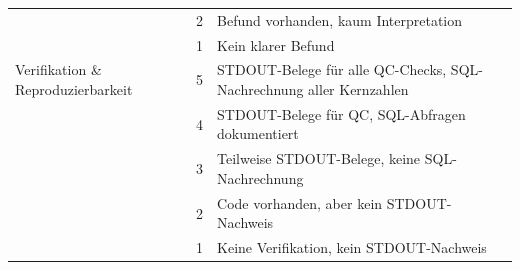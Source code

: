 \documentclass[11pt,a4paper]{article}
\begin{document}
\begin{table}[h]
\begin{tabular}{p{2.8cm}p{1.3cm}p{9cm}}
  & 2 & Befund vorhanden, kaum Interpretation \\
  & 1 & Kein klarer Befund \\
\midrule
Verifikation \& Reproduzierbarkeit
  & 5 & STDOUT-Belege für alle QC-Checks, SQL-Nachrechnung aller Kernzahlen \\
  & 4 & STDOUT-Belege für QC, SQL-Abfragen dokumentiert \\
  & 3 & Teilweise STDOUT-Belege, keine SQL-Nachrechnung \\
  & 2 & Code vorhanden, aber kein STDOUT-Nachweis \\
  & 1 & Keine Verifikation, kein STDOUT-Nachweis \\
\bottomrule
\end{tabular}
\end{table}
\end{document}
